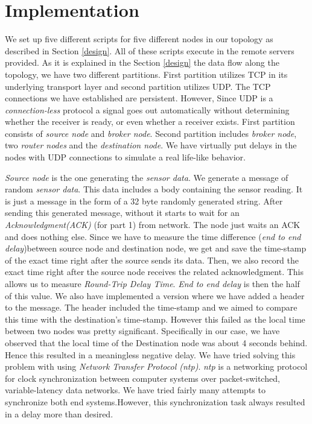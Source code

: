 \documentclass[conference]{IEEEtran}
\begin{document}
\section{Implementation} \label{implementation}
\par We set up five different scripts for five different nodes in our topology as described in Section \ref{design}. All of these scripts execute in the remote servers provided. As it is explained in the Section \ref{design} the data flow along the topology, we have two different partitions. First partition utilizes TCP in its underlying transport layer and second partition utilizes UDP. The TCP connections we have established are persistent. However, Since UDP is a \textit{connection-less} protocol a signal goes out automatically without determining whether the receiver is ready, or even whether a receiver exists.  First partition consists of \textit{source node} and \textit{broker node}. Second partition includes \textit{broker node}, two \textit{router nodes} and the \textit{destination node}. We have virtually put delays in the nodes with UDP connections to simulate a real life-like behavior. 

\par \textit{Source node} is the one generating the \textit{sensor data}. We generate a message of random \textit{sensor data}. This data includes a body containing the sensor reading. It is just a message in the form of a 32 byte randomly generated string. After sending this generated message, without it starts to wait for an \textit{Acknowledgment(ACK)} (for part 1) from network. The node just waits an ACK and does nothing else. Since we have to measure the time difference (\textit{end to end delay})between source node and destination node, we get and save the time-stamp of the exact time right after the source sends its data. Then, we also record the exact time right after the source node receives the related acknowledgment. This allows us to measure \textit{Round-Trip Delay Time}. \textit{End to end delay} is then the half of this value. We also have implemented a version where we have added a header to the message. The header included the time-stamp and we aimed to compare this time with the destination's time-stamp. However this failed as the local time between two nodes was pretty significant. Specifically in our case, we have observed that the local time of the Destination node was about 4 seconds behind. Hence this resulted in a meaningless negative delay. We have tried solving this problem with using \textit{Network Transfer Protocol (ntp)}. \textit{ntp} is a networking protocol for clock synchronization between computer systems over packet-switched, variable-latency data networks. We have tried fairly many attempts to synchronize both end systems.However, this synchronization task always resulted in a delay more than desired.
 
\end{document}
